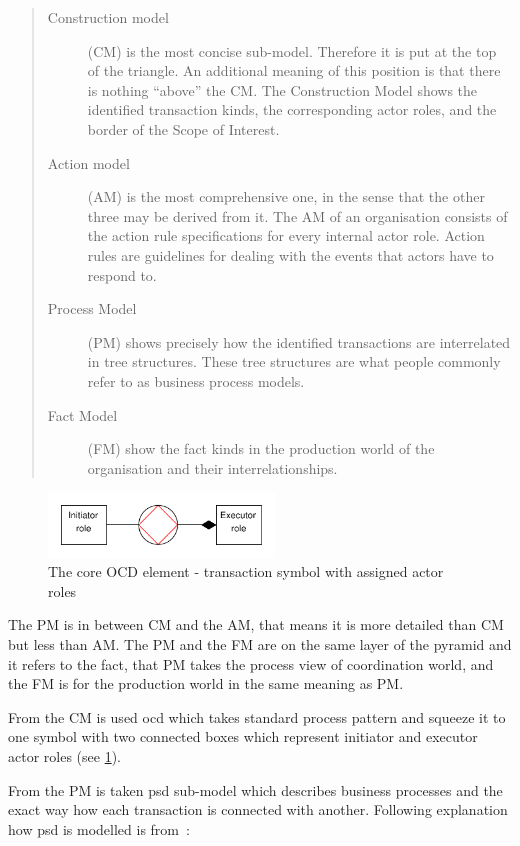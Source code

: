 \begin{quote}
	\begin{description}
		\item[Construction model] (CM) is the most concise sub-model. Therefore it is put at the top of the triangle. An additional meaning of this position is that there is nothing ``above'' the CM. The Construction Model shows the identified transaction kinds, the corresponding actor roles, and the border of the Scope of Interest.
         \item[Action model] (AM) is the most comprehensive one, in the sense that the other three may be derived from it. The AM of an organisation consists of the action rule specifications for every internal actor role. Action rules are guidelines for dealing with the events that actors have to respond to.         
         \item[Process Model] (PM) shows precisely how the identified transactions are interrelated in tree structures. These tree structures are what people commonly refer to as business process models.         
         \item[Fact Model] (FM) show the fact kinds in the production world of the organisation and their interrelationships. 
	\end{description}
\end{quote}

\begin{figure}[ht!]
	\centering
    \includegraphics[width=6cm, keepaspectratio]{img/ocd-symbol-example}
    \caption{The core OCD element - transaction symbol with assigned actor roles}
    \label{fig:ocd-symbol-example}
\end{figure}

The PM is in between CM and the AM, that means it is more detailed than CM but less than AM. The PM and the FM are on the same layer of the pyramid and it refers to the fact, that PM takes the process view of coordination world, and the FM is for the production world in the same meaning as PM.

From the CM is used \gls{ocd} which takes standard process pattern and squeeze it to one symbol with two connected boxes which represent initiator and executor actor roles (see \cref{fig:ocd-symbol-example}).

From the PM is taken \gls{psd} sub-model which describes business processes and the exact way how each transaction is connected with another. Following explanation how \gls{psd} is modelled is from~\cite{dietz-essence-2015}:

